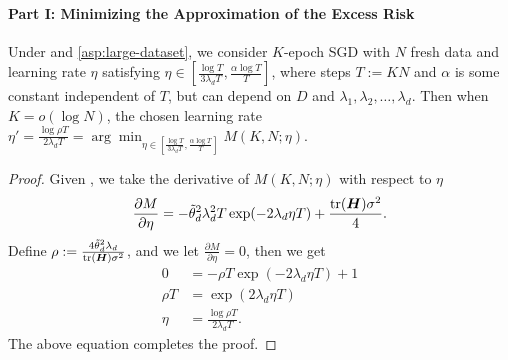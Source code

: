 \paragraph{Part I: Minimizing the Approximation of the Excess Risk}
\begin{lemma}\label{thm:approx-convex-opt-lr}
    Under  and \ref{asp:large-dataset}, we consider $K$-epoch SGD with $N$ fresh data and learning rate $\eta$ satisfying $\eta \in [\frac{\log T}{3\lambda_d T}, \frac{\alpha\log T}{T}]$, where steps $T:= KN$ and $\alpha$ is some constant independent of $T$, but can depend on $D$ and $\lambda_1,\lambda_2,\dots,\lambda_d$. Then when $K=o\left(\log N\right)$, the chosen learning rate  $\eta' = \frac{\log  \rho T}{2\lambda_d T} = \arg\min_{\eta \in [\frac{\log T}{3\lambda_d T}, \frac{\alpha\log T}{T}]}M(K, N;\eta)$.
\end{lemma}
\begin{proof}
    Given , we take the derivative of $M(K,N;\eta)$ with respect to $\eta$
\begin{align*}
    \frac{\partial M}{\partial \eta} = -\Tilde{\theta}_d^2 \lambda_d^2 T \exp(-2\lambda_d\eta T)  + \frac{\mathrm{tr}({\bm{H}})\sigma^2}{4}.
\end{align*}
Define $\rho := \frac{4\Tilde{\theta}_d^2\lambda_d}{\mathrm{tr}({\bm{H}})\sigma^2}$, and we let $\frac{\partial M}{\partial \eta} = 0$, then we get
\begin{align*}
    0&= -\rho T \exp(-2\lambda_d\eta T)  + 1\\    
    \rho T &= \exp(2\lambda_d\eta T)\\
    \eta &= \frac{\log  \rho T}{2\lambda_d T}.
\end{align*} 
The above equation completes the proof.
\end{proof}

